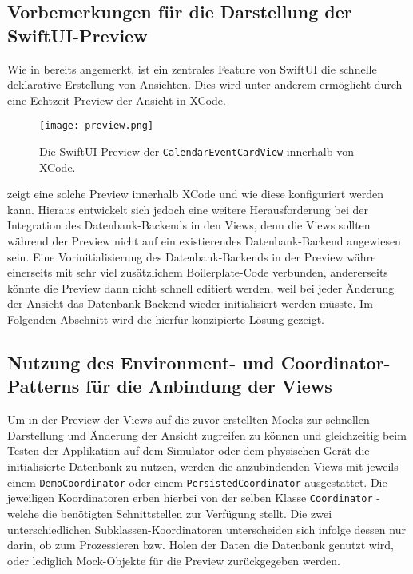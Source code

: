 \subsection{Vorbemerkungen für die Darstellung der SwiftUI-Preview}

Wie in  bereits angemerkt, ist ein zentrales Feature von SwiftUI die schnelle deklarative Erstellung von Ansichten. Dies wird unter anderem ermöglicht durch eine Echtzeit-Preview der Ansicht in XCode.

\begin{figure}[H]
\texttt{[image: preview.png]}
\caption{Die SwiftUI-Preview der \texttt{CalendarEventCardView} innerhalb von XCode.}\label{fig:preview}
\end{figure}

 zeigt eine solche Preview innerhalb XCode und wie diese konfiguriert werden kann. Hieraus entwickelt sich jedoch eine weitere Herausforderung bei der Integration des Datenbank-Backends in den Views, denn die Views sollten während der Preview nicht auf ein existierendes Datenbank-Backend angewiesen sein. Eine Vorinitialisierung des Datenbank-Backends in der Preview währe einerseits mit sehr viel zusätzlichem Boilerplate-Code verbunden, andererseits könnte die Preview dann nicht schnell editiert werden, weil bei jeder Änderung der Ansicht das Datenbank-Backend wieder initialisiert werden müsste. Im Folgenden Abschnitt wird die hierfür konzipierte Lösung gezeigt.

\subsection{Nutzung des Environment- und Coordinator-Patterns für die Anbindung der Views}

Um in der Preview der Views auf die zuvor erstellten Mocks zur schnellen Darstellung und Änderung der Ansicht zugreifen zu können und gleichzeitig beim Testen der Applikation auf dem Simulator oder dem physischen Gerät die initialisierte Datenbank zu nutzen, werden die anzubindenden Views mit jeweils einem \texttt{DemoCoordinator} oder einem \texttt{PersistedCoordinator} ausgestattet. Die jeweiligen Koordinatoren erben hierbei von der selben Klasse \texttt{Coordinator} - welche die benötigten Schnittstellen zur Verfügung stellt. Die zwei unterschiedlichen Subklassen-Koordinatoren unterscheiden sich infolge dessen nur darin, ob zum Prozessieren bzw. Holen der Daten die Datenbank genutzt wird, oder lediglich Mock-Objekte für die Preview zurückgegeben werden.

